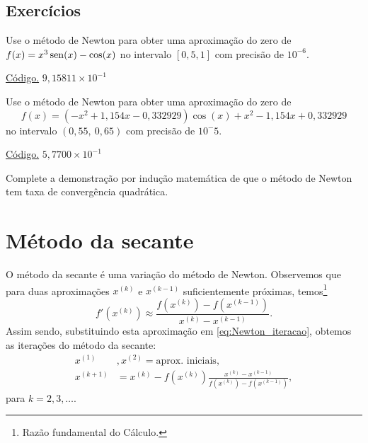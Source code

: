 \subsection*{Exercícios}

\begin{exer}\label{exer:Newton_1}
  Use o método de Newton para obter uma aproximação do zero de $f(x)=x^3\operatorname{sen}(x)-\cos(x)$ no intervalo $[0,5, 1]$ com precisão de $10^{-6}$.
\end{exer}
\begin{resp}
    \ifisoctave 
  \href{https://github.com/phkonzen/notas/blob/master/src/MatematicaNumerica/cap_eq1d/dados/exer_Newton_1/exer_Newton_1.m}{Código.} 
  \fi
  $9,15811\times 10^{-1}$
\end{resp}

\begin{exer}\label{exer:Newton_multpar}
  Use o método de Newton para obter uma aproximação do zero de
  \begin{equation}
    f(x) = (-x^2+1,154x-0,332929)\cos(x) + x^2 - 1,154x + 0,332929
  \end{equation}
no intervalo $(0,55, ~0,65)$ com precisão de $10^-5$.
\end{exer}
\begin{resp}
    \ifisoctave 
  \href{https://github.com/phkonzen/notas/blob/master/src/MatematicaNumerica/cap_eq1d/dados/exer_Newton_multpar/exer_Newton_multpar.m}{Código.} 
  \fi
  $5,7700\times 10^{-1}$
\end{resp}

\begin{exer}\label{ex:Newton_analise_conv}
  Complete a demonstração por indução matemática de que o método de Newton tem taxa de convergência quadrática.
\end{exer}

\section{Método da secante}\label{cap_eq1d_sec_secante}

O método da secante é uma variação do método de Newton. Observemos que para duas aproximações $x^{(k)}$ e $x^{(k-1)}$ suficientemente próximas, temos\footnote{Razão fundamental do Cálculo.}
\begin{equation}
  f'(x^{(k)}) \approx \frac{f(x^{(k)})-f(x^{(k-1)})}{x^{(k)}-x^{(k-1)}}.
\end{equation}
Assim sendo, substituindo esta aproximação em \eqref{eq:Newton_iteracao}, obtemos as iterações do método da secante:
\begin{align}
  x^{(1)}&, x^{(2)} = \text{aprox. iniciais},\\
  x^{(k+1)} &= x^{(k)} - f(x^{(k)})\frac{x^{(k)}-x^{(k-1)}}{f(x^{(k)})-f(x^{(k-1)})},
\end{align}
para $k=2,3,\ldots$.

